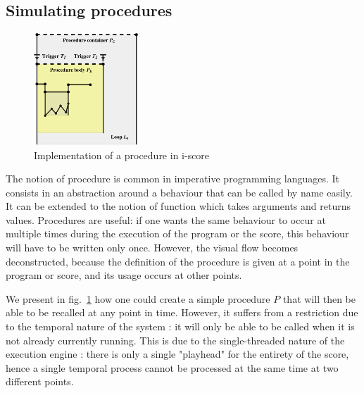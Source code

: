 \documentclass{article}
\begin{document}
\subsection{Simulating procedures}
\begin{figure}[h]
\centering
\includegraphics[width=0.35\textwidth]{images/function.eps}
\caption{Implementation of a procedure in i-score}
\label{fig.function}
\end{figure}

The notion of procedure is common in imperative programming languages.
It consists in an abstraction around a behaviour that can be called 
by name easily.
It can be extended to the notion of function which takes arguments 
and returns values.
Procedures are useful: if one wants the same behaviour to occur at multiple times during
the execution of the program or the score, this behaviour will 
have to be written only once.
However, the visual flow becomes deconstructed, because 
the definition of the procedure is given at a point in the program or score, 
and its usage occurs at other points.

We present in fig.~\ref{fig.function} how one could create a simple 
procedure $P$ that will then be able to be recalled at any point in time.
However, it suffers from a restriction due to the temporal nature of the system : 
it will only be able to be called when it is not already currently running. 
This is due to the single-threaded nature of the execution engine : there is 
only a single "playhead" for the entirety of the score, hence a single 
temporal process cannot be processed at the same time at two different points.
\end{document}
